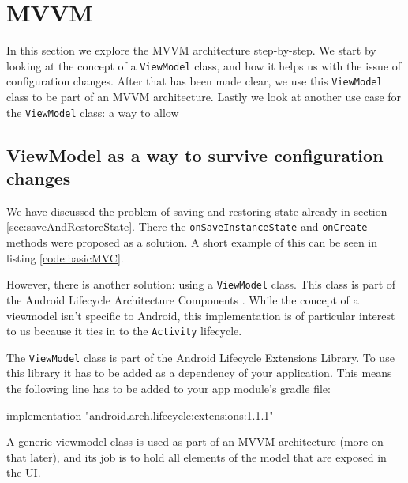\section{MVVM}
In this section we explore the MVVM architecture step-by-step. 
We start by looking at the concept of a \lstinline!ViewModel! class, and how it helps us with the issue of configuration changes.
After that has been made clear, we use this \lstinline!ViewModel! class to be part of an MVVM architecture. 
Lastly we look at another use case for the \lstinline!ViewModel! class: a way to allow 

\subsection{ViewModel as a way to survive configuration changes}
We have discussed the problem of saving and restoring state already in section \ref{sec:saveAndRestoreState}. 
There the \lstinline!onSaveInstanceState! and \lstinline!onCreate! methods were proposed as a solution.
A short example of this can be seen in listing \ref{code:basicMVC}.



However, there is another solution: using a \lstinline!ViewModel! class.
This class is part of the Android Lifecycle Architecture Components \cite{viewModelOfficial}.
While the concept of a viewmodel isn't specific to Android, this implementation is of particular interest to us because it ties in to the \lstinline!Activity! lifecycle.

The \lstinline!ViewModel! class is part of the Android Lifecycle Extensions Library.
To use this library it has to be added as a dependency of your application.
This means the following line has to be added to your app module's gradle file:

\begin{android}
	implementation "android.arch.lifecycle:extensions:1.1.1"
\end{android}


A generic viewmodel class is used as part of an MVVM architecture (more on that later), and its job is to hold all elements of the model that are exposed in the UI.

